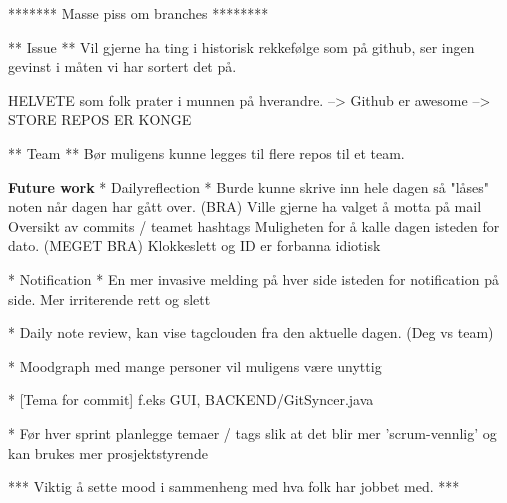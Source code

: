 ******* Masse piss om branches ********

** Issue **
Vil gjerne ha ting i historisk rekkefølge som på github, ser ingen gevinst i måten vi har sortert det på.

HELVETE som folk prater i munnen på hverandre.
--> Github er awesome --> STORE REPOS ER KONGE

** Team **
Bør muligens kunne legges til flere repos til et team.


\textbf{Future work}
* Dailyreflection *
	Burde kunne skrive inn hele dagen så "låses" noten når dagen har gått over. (BRA)
	Ville gjerne ha valget å motta på mail
	Oversikt av commits / teamet hashtags
	Muligheten for å kalle dagen isteden for dato. (MEGET BRA)
	Klokkeslett og ID er forbanna idiotisk

	* Notification *
		En mer invasive melding på hver side isteden for notification på side.
			Mer irriterende rett og slett

* Daily note review, kan vise tagclouden fra den aktuelle dagen. (Deg vs team)
	

* Moodgraph med mange personer vil muligens være unyttig


* [Tema for commit] f.eks GUI, BACKEND/GitSyncer.java


* Før hver sprint planlegge temaer / tags slik at det blir mer 'scrum-vennlig' og kan brukes mer prosjektstyrende

*** Viktig å sette mood i sammenheng med hva folk har jobbet med. *** 